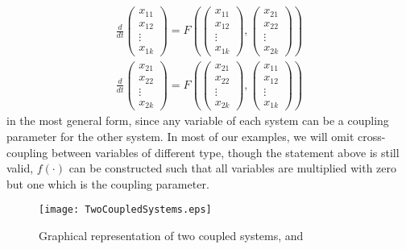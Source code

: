 \begin{align}
\frac{d}{dt} \left( \begin{array}{c}
x_{11} \\
x_{12} \\
\vdots \\
x_{1k}
\end{array} \right)=
F\left(
\left( \begin{array}{c}
x_{11} \\
x_{12} \\
\vdots \\
x_{1k}
\end{array} \right)
,
\left( \begin{array}{c}
x_{21} \\
x_{22} \\
\vdots \\
x_{2 k}
\end{array} \right)\right)
\end{align}
\begin{align}
\frac{d}{dt}  \left( \begin{array}{c}
x_{21} \\
x_{22} \\
\vdots \\
x_{2k}
\end{array} \right) =
F \left(
\left( \begin{array}{c}
x_{21}\\
x_{22}\\
\vdots\\
x_{2k}
\end{array} \right)
,
\left( \begin{array}{c}
x_{11}\\
x_{12}\\
\vdots\\
x_{1 k}
\end{array} \right)\right)
\end{align}
%
in the most general form, since any variable of each system can be a coupling parameter for the other system. In most of our examples, we will omit cross-coupling between variables of different type, though the statement above is still valid, $f(\cdot)$ can be constructed such that all variables are multiplied with zero but one which is the coupling parameter. 
%
\begin{figure}[H]
\center
\texttt{[image: TwoCoupledSystems.eps]}
\caption[Geometrical representation of two coupled systems]{Graphical representation of two coupled systems,  and  }
\end{figure}

